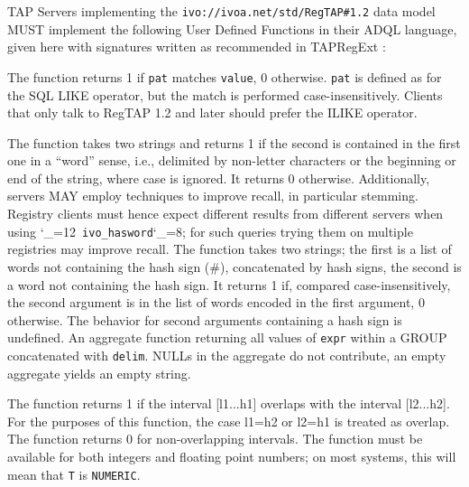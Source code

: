 \documentclass[11pt,a4paper]{ivoa}
\makeatletter
\def\rtent#1{\texttt{\color{rtcolor}\verb|#1|}}
\def\makeunderscoreletter{\catcode`\_=12}
\def\makeunderscoresubscript{\catcode`\_=8}
\def\rtent{\makeunderscoreletter\relax\rt@nt}
\def\rt@nt#1{\texttt{\color{rtcolor} #1}\makeunderscoresubscript{}}
\makeatother
\begin{document}
TAP Servers implementing the
\texttt{ivo://ivoa.net/std/RegTAP\#1.2} data model MUST
implement the following User Defined Functions in their ADQL language,
given here
with signatures written as recommended in TAPRegExt \citep{2012ivoa.spec.0827D}:


\begin{bigdescription}
The function returns 1 if \texttt{pat}  matches
\texttt{value}, 0 otherwise.
\texttt{pat}  is defined as for the SQL LIKE operator, but the
match is performed case-insensitively.  Clients that only talk to RegTAP
1.2 and later should prefer the ILIKE operator.

The function takes two strings and returns 1 if the second is
contained in the first one in a ``word'' sense, i.e., delimited by
non-letter characters or the beginning or end of the string, where case
is ignored.  It returns 0 otherwise.
Additionally, servers MAY employ techniques to improve recall, in
particular stemming.  Registry clients must hence expect different results
from different servers when using \rtent{ivo_hasword}; for such
queries trying them on multiple registries may improve recall.
The function takes two strings; the first is a list of words not
containing the hash sign (\#), concatenated by hash signs, the second is
a word not containing the hash sign.  It returns 1 if, compared
case-insensitively, the second argument is in the list of words encoded in
the first argument, 0 otherwise.  The behavior for second
arguments containing a hash sign is undefined.
An aggregate function returning all values of
\texttt{expr} within a GROUP concatenated with
\texttt{delim}.  NULLs in the aggregate do not contribute, an empty
aggregate yields an empty string.

The function returns 1 if the interval [l1...h1] overlaps with
the interval [l2...h2].  For the purposes of this function,
the case l1=h2 or l2=h1 is treated as overlap.  The function
returns 0 for non-overlapping intervals.  The function must be
available for both integers and floating point numbers; on most systems,
this will mean that \verb|T| is \verb|NUMERIC|.

\end{bigdescription}
\end{document}
